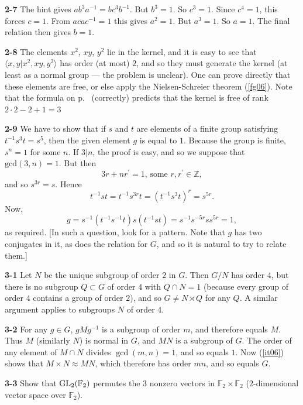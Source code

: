 \documentclass[a4paper,11pt,final]{memoir}%
\theoremstyle{nonumberplain}
\begin{document}
\bigskip\noindent\textbf{2-7}
The hint gives $ab^{3}a^{-1}=bc^{3}b^{-1}$. But $b^{3}=1$. So $c^{3}=1$. Since
$c^{4}=1$, this forces $c=1$. From $acac^{-1}=1$ this gives $a^{2}=1$. But
$a^{3}=1$. So $a=1$. The final relation then gives $b=1 $.

\bigskip\noindent\textbf{2-8}
The elements $x^{2}$, $xy$, $y^{2}$ lie in the kernel, and it is easy to see
that $\langle x,y|x^{2},xy,y^{2}\rangle$ has order (at most) $2$, and so they
must generate the kernel (at least as a normal group --- the problem is
unclear). One can prove directly that these elements are free, or else apply
the Nielsen-Schreier theorem (\ref{fg06}). Note that the formula on
p.~\pageref{fg06} (correctly) predicts that the kernel is free of rank
$2\cdot2-2+1=3$

\bigskip\noindent\textbf{2-9}
We have to show that if $s$ and $t$ are elements of a finite group satisfying
$t^{-1}s^{3}t=s^{5}$, then the given element $g$ is equal to $1$. Because the
group is finite, $s^{n}=1$ for some $n$. If $3|n$, the proof is easy, and so
we suppose that $\mathrm{gcd}(3,n)=1$. But then
\[
3r+nr^{\prime}=1\text{, some }r,r^{\prime}\in\mathbb{Z}{},
\]
and so $s^{3r}=s$. Hence
\[
t^{-1}st=t^{-1}s^{3r}t=(t^{-1}s^{3}t)^{r}=s^{5r}.
\]
Now,\hfill%
\[
g=s^{-1}(t^{-1}s^{-1}t)s(t^{-1}st)=s^{-1}s^{-5r}ss^{5r}=1,
\]
as required. [In such a question, look for a pattern. Note that $g$ has two
conjugates in it, as does the relation for $G$, and so it is natural to try to
relate them.]

\bigskip\noindent\textbf{3-1}
Let $N$ be the unique subgroup of order $2$ in $G$. Then $G/N$ has order $4$,
but there is no subgroup $Q\subset G$ of order $4$ with $Q\cap N=1$ (because
every group of order $4$ contains a group of order $2$), and so $G\neq
N\rtimes Q$ for any $Q$. A similar argument applies to subgroups $N$ of order
$4$.

\bigskip\noindent\textbf{3-2}
For any $g\in G$, $gMg^{-1}$ is a subgroup of order $m$, and therefore equals
$M$. Thus $M$ (similarly $N$) is normal in $G $, and $MN$ is a subgroup of
$G$. The order of any element of $M\cap N$ divides $\gcd(m,n)=1$, and so
equals $1$. Now (\ref{it06}) shows that $M\times N\approx MN$, which therefore
has order $mn$, and so equals $G$.

\bigskip\noindent\textbf{3-3}
Show that $\operatorname{GL}_{2}(\mathbb{F}_{2})$ permutes the $3$ nonzero vectors in
$\mathbb{F}_{2}\times\mathbb{F}{}_{2}$ ($2$-dimensional vector space over
$\mathbb{F}{}_{2}$).
\end{document}
